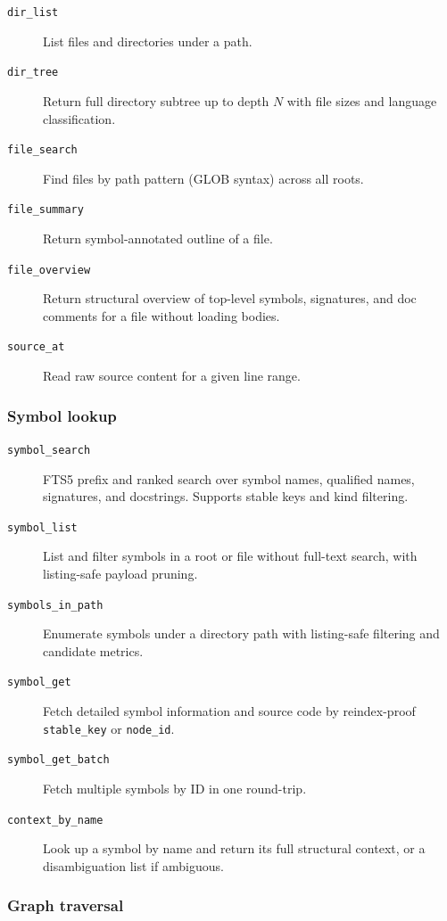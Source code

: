 \begin{description}
  \item[\texttt{dir\_list}] List files and directories under a path.
  \item[\texttt{dir\_tree}] Return full directory subtree up to depth $N$ with
        file sizes and language classification.
  \item[\texttt{file\_search}] Find files by path pattern (GLOB syntax) across all roots.
  \item[\texttt{file\_summary}] Return symbol-annotated outline of a file.
  \item[\texttt{file\_overview}] Return structural overview of top-level symbols,
        signatures, and doc comments for a file without loading bodies.
  \item[\texttt{source\_at}] Read raw source content for a given line range.
\end{description}

\subsubsection{Symbol lookup}

\begin{description}
  \item[\texttt{symbol\_search}] FTS5 prefix and ranked search over symbol names,
        qualified names, signatures, and docstrings. Supports stable keys and
        kind filtering.
  \item[\texttt{symbol\_list}] List and filter symbols in a root or file without
        full-text search, with listing-safe payload pruning.
  \item[\texttt{symbols\_in\_path}] Enumerate symbols under a directory path with
        listing-safe filtering and candidate metrics.
  \item[\texttt{symbol\_get}] Fetch detailed symbol information and source code
        by reindex-proof \texttt{stable\_key} or \texttt{node\_id}.
  \item[\texttt{symbol\_get\_batch}] Fetch multiple symbols by ID in one
        round-trip.
  \item[\texttt{context\_by\_name}] Look up a symbol by name and return its full
        structural context, or a disambiguation list if ambiguous.
\end{description}

\subsubsection{Graph traversal}

